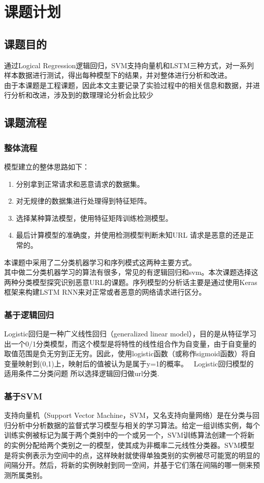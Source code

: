 \section{课题计划}
\subsection{课题目的}
通过Logical Regression逻辑回归，SVM支持向量机和LSTM三种方式，对一系列样本数据进行测试，得出每种模型下的结果，并对整体进行分析和改进。
\\\indent{}由于本课题是工程课题，因此本文主要记录了实验过程中的相关信息和数据，并进行分析和改进，涉及到的数理理论分析会比较少
\subsection{课题流程}
\subsubsection{整体流程}
模型建立的整体思路如下： 
\begin{enumerate}
    \item 分别拿到正常请求和恶意请求的数据集。 
    \item 对无规律的数据集进行处理得到特征矩阵。 
    \item 选择某种算法模型，使用特征矩阵训练检测模型。
    \item 最后计算模型的准确度，并使用检测模型判断未知URL 请求是恶意的还是正常的。
\end{enumerate}
本课题中采用了二分类机器学习和序列模式这两种主要方式。
\\\indent{}其中做二分类机器学习的算法有很多，常见的有逻辑回归和svm。本次课题选择这两种分类模型探究识别恶意URL的课题。序列模型的分析话主要是通过使用Keras框架来构建LSTM RNN来对正常或者恶意的网络请求进行区分。
\subsubsection{基于逻辑回归}
Logistic回归是一种广义线性回归（generalized linear model），目的是从特征学习出一个0/1分类模型，而这个模型是将特性的线性组合作为自变量，由于自变量的取值范围是负无穷到正无穷。因此，使用logistic函数（或称作sigmoid函数）将自变量映射到(0,1)上，映射后的值被认为是属于y=1的概率。 
Logistic回归模型的适用条件二分类问题 所以选择逻辑回归做url分类.
\subsubsection{基于SVM}
支持向量机（Support Vector Machine，SVM，又名支持向量网络）是在分类与回归分析中分析数据的监督式学习模型与相关的学习算法。给定一组训练实例，每个训练实例被标记为属于两个类别中的一个或另一个，SVM训练算法创建一个将新的实例分配给两个类别之一的模型，使其成为非概率二元线性分类器。SVM模型是将实例表示为空间中的点，这样映射就使得单独类别的实例被尽可能宽的明显的间隔分开。然后，将新的实例映射到同一空间，并基于它们落在间隔的哪一侧来预测所属类别。
